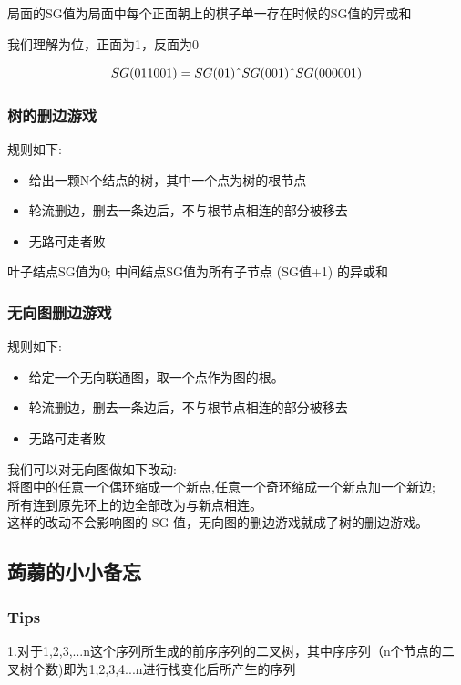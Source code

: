 \documentclass{article}
\begin{document}
局面的SG值为局面中每个正面朝上的棋子单一存在时候的SG值的异或和

我们理解为位，正面为1，反面为0

 $$SG(011001) = SG(01) \text{\^{}} SG(001) \text{\^{}} SG(000001)$$
 
\subsubsection{树的删边游戏}

规则如下:
\begin{itemize}
\item 给出一颗N个结点的树，其中一个点为树的根节点
\item 轮流删边，删去一条边后，不与根节点相连的部分被移去
\item 无路可走者败
\end{itemize}

叶子结点SG值为0; 中间结点SG值为所有子节点 (SG值+1) 的异或和

\subsubsection{无向图删边游戏}

规则如下:
\begin{itemize}
\item 给定一个无向联通图，取一个点作为图的根。
\item 轮流删边，删去一条边后，不与根节点相连的部分被移去
\item 无路可走者败
\end{itemize}

我们可以对无向图做如下改动:	\\
将图中的任意一个偶环缩成一个新点,任意一个奇环缩成一个新点加一个新边;	\\
所有连到原先环上的边全部改为与新点相连。	\\
这样的改动不会影响图的 SG 值，无向图的删边游戏就成了树的删边游戏。	\\


\newpage
\subsection{蒟蒻的小小备忘}
\subsubsection{Tips}
1.对于1,2,3,...n这个序列所生成的前序序列的二叉树，其中序序列（n个节点的二叉树个数)即为1,2,3,4...n进行栈变化后所产生的序列 \\
\end{document}
